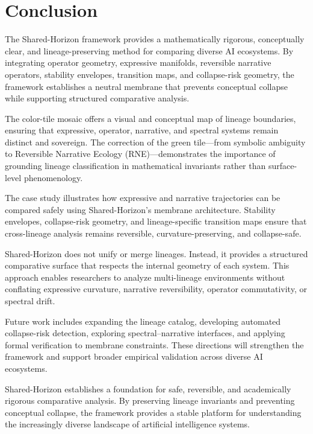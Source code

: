 
\section{Conclusion}
\label{sec:conclusion}

The Shared-Horizon framework provides a mathematically rigorous, conceptually
clear, and lineage-preserving method for comparing diverse AI ecosystems. By
integrating operator geometry, expressive manifolds, reversible narrative
operators, stability envelopes, transition maps, and collapse-risk geometry, the
framework establishes a neutral membrane that prevents conceptual collapse while
supporting structured comparative analysis.

The color-tile mosaic offers a visual and conceptual map of lineage boundaries,
ensuring that expressive, operator, narrative, and spectral systems remain
distinct and sovereign. The correction of the green tile—from symbolic ambiguity
to Reversible Narrative Ecology (RNE)—demonstrates the importance of grounding
lineage classification in mathematical invariants rather than surface-level
phenomenology.

The case study illustrates how expressive and narrative trajectories can be
compared safely using Shared-Horizon’s membrane architecture. Stability
envelopes, collapse-risk geometry, and lineage-specific transition maps ensure
that cross-lineage analysis remains reversible, curvature-preserving, and
collapse-safe.

Shared-Horizon does not unify or merge lineages. Instead, it provides a
structured comparative surface that respects the internal geometry of each
system. This approach enables researchers to analyze multi-lineage environments
without conflating expressive curvature, narrative reversibility, operator
commutativity, or spectral drift.

Future work includes expanding the lineage catalog, developing automated
collapse-risk detection, exploring spectral–narrative interfaces, and applying
formal verification to membrane constraints. These directions will strengthen
the framework and support broader empirical validation across diverse AI
ecosystems.

Shared-Horizon establishes a foundation for safe, reversible, and academically
rigorous comparative analysis. By preserving lineage invariants and preventing
conceptual collapse, the framework provides a stable platform for understanding
the increasingly diverse landscape of artificial intelligence systems.
